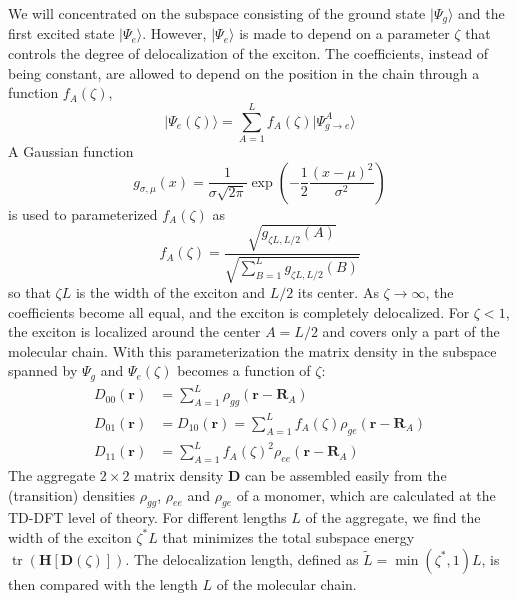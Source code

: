 \documentclass[journal=jacsat,manuscript=article]{achemso}
\DeclareMathOperator{\tr}{tr}
\newcommand\m[1]{\mathbf{#1}}
\renewcommand\vec[1]{\mathbf{#1}}
\begin{document}
We will concentrated on the subspace consisting of the ground state $\vert \Psi_g \rangle$ and the first excited state $\vert \Psi_e \rangle$.
However, $\vert \Psi_e \rangle$ is made to depend on a parameter $\zeta$ that controls the degree of delocalization of the exciton. The coefficients,
instead of being constant, are allowed to depend on the position in the chain through a function $f_A(\zeta)$,
\begin{equation}
  \vert \Psi_e(\zeta) \rangle = \sum_{A=1}^L f_A(\zeta) \vert \Psi_{g \to e}^A \rangle
\end{equation}
A Gaussian function
\begin{equation}
g_{\sigma,\mu}(x) = \frac{1}{\sigma \sqrt{2 \pi}} \exp\left(-\frac{1}{2} \frac{(x - \mu)^2}{\sigma^2}\right)
\end{equation}
is used to parameterized  $f_A(\zeta)$ as 
\begin{equation}
 f_A(\zeta) = \frac{\sqrt{g_{\zeta L,L/2}(A)}}{\sqrt{\sum_{B=1}^L g_{\zeta L,L/2}(B)}}
\end{equation}
so that $\zeta L$ is the width of the exciton and $L/2$ its center.
As $\zeta \to \infty$, the coefficients become all equal,
and the exciton is completely delocalized. For $\zeta < 1$, the exciton is localized around the center $A=L/2$
and covers only a part of the molecular chain.
With this parameterization the matrix density in the subspace spanned by $\Psi_g$ and $\Psi_e(\zeta)$ becomes a function of $\zeta$:
\begin{align}
 D_{00}(\vec{r}) &= \sum_{A=1}^L \rho_{gg}(\vec{r}-\vec{R}_A) \\
 D_{01}(\vec{r}) &= D_{10}(\vec{r}) = \sum_{A=1}^L f_A(\zeta) \rho_{ge}(\vec{r} - \vec{R}_A) \\
 D_{11}(\vec{r}) &= \sum_{A=1}^L f_A(\zeta)^2 \rho_{ee}(\vec{r} - \vec{R}_A)
\end{align}
The aggregate $2\times 2$ matrix density $\m{D}$ can be assembled easily from the (transition) densities $\rho_{gg}$, $\rho_{ee}$ and $\rho_{ge}$ of
a monomer, which are calculated at the TD-DFT level of theory.
For different lengths $L$ of the aggregate, we find the width of the exciton $\zeta^* L$ that minimizes
the total subspace energy $\tr(\m{H}[\m{D}(\zeta)])$. The delocalization length, defined as $\tilde{L} = \min(\zeta^*, 1) L$,
is then compared with the length $L$ of the molecular chain.

\FloatBarrier
\end{document}
